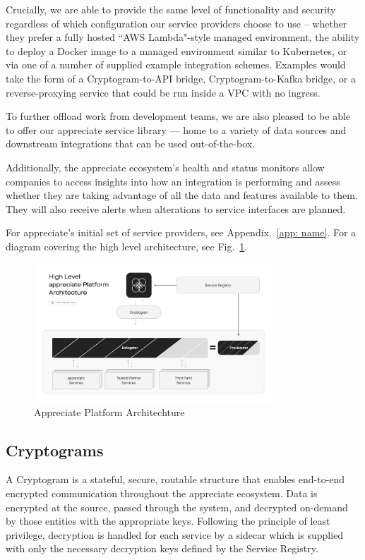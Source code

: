 \documentclass[a4paper,onecolumn, 10.5pt]{article}
\begin{document}
Crucially, we are able to provide the same level of functionality and security regardless of which configuration our service providers choose to use -- whether they prefer a fully hosted “AWS Lambda"-style managed environment, the ability to deploy a Docker image\cite{modernapparch} to a managed environment similar to Kubernetes, 
or via one of a number of supplied example integration schemes. Examples would take the form of a Cryptogram-to-API bridge, Cryptogram-to-Kafka bridge, or a reverse-proxying service that could be run inside a VPC with no ingress.

To further offload work from development teams, we are also pleased to be able to offer our appreciate service library — home to a variety of data sources and downstream integrations that can be used out-of-the-box.

Additionally, the appreciate ecosystem’s health and status monitors allow companies to access insights into how an integration is performing and assess whether they are taking advantage of all the data and features available to them. They will also receive alerts when alterations to service interfaces are planned.


For appreciate’s initial set of service providers, see Appendix.~\ref{app: name}. \hfill \break
For a diagram covering the high level architecture, see Fig.~\ref{fig: app_plat}. \\

\begin{figure}[!htb]
	\centering %
		\includegraphics[clip, trim=0cm 2cm 0cm 2cm, width=0.80\textwidth]{./images/Architecture.pdf}
	\caption{Appreciate Platform Architechture}
	\label{fig: app_plat}
\end{figure}

\subsection{Cryptograms}
A Cryptogram is a stateful, secure, routable structure that enables end-to-end encrypted communication throughout the appreciate ecosystem. Data is encrypted at the source, passed through the system, and decrypted on-demand by those entities with the appropriate keys. Following the principle of least privilege, decryption is handled for each service by a sidecar which is supplied with only the necessary decryption keys defined by the Service Registry.
\end{document}
